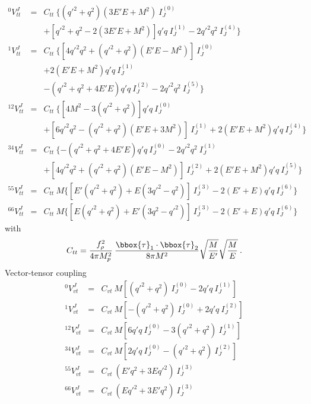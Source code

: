 \begin{eqnarray}
^0V^J_{tt} & = &
C_{tt}\: \{ (q'^2+q^2)(3E'E+M^2)\: I^{(0)}_J \nonumber \\
 & & + [q'^2+q^2-2(3E'E+M^2)]q'q\: I^{(1)}_J - 2q'^2q^2\: I^{(4)}_J \}
\nonumber \\
^1V^J_{tt} & = &
C_{tt}\: \{ [4q'^2q^2+(q'^2+q^2)(E'E-M^2)]\: I^{(0)}_J \nonumber \\
 & & + 2(E'E+M^2)q'q\: I^{(1)}_J \nonumber \\
 & & - (q'^2+q^2+4E'E)q'q\: I^{(2)}_J - 2q'^2q^2\: I^{(5)}_J \}
\label{32.14} \\
^{12}V^J_{tt} & = &
C_{tt}\: \{ [4M^2-3(q'^2+q^2)]q'q\: I^{(0)}_J \nonumber \\
 & & + [6q'^2q^2-(q'^2+q^2)(E'E+3M^2)]\: I^{(1)}_J +
  2(E'E+M^2)q'q\: I^{(4)}_J \}
\nonumber \\
^{34}V^J_{tt} & = &
C_{tt}\: \{ -(q'^2+q^2+4E'E)q'q\: I^{(0)}_J - 2q'^2q^2\: I^{(1)}_J
\nonumber \\
 & & +[4q'^2q^2+(q'^2+q^2)(E'E-M^2)]\: I^{(2)}_J
     +2(E'E+M^2)q'q\: I^{(5)}_J \}
\nonumber \\
^{55}V^J_{tt} & = &
C_{tt}\:  M \{ [ E'(q'^2+q^2) + E (3q'^2 - q^2)]\: I^{(3)}_J
 - 2(E'+E)q'q\: I^{(6)}_J \}
\nonumber \\
^{66}V^J_{tt} & = &
C_{tt}\:  M \{ [ E(q'^2+q^2) + E'(3q^2 - q'^2)]\: I^{(3)}_J
 - 2(E'+E)q'q\: I^{(6)}_J \}
\nonumber
\end{eqnarray}
with
\begin{equation}
C_{tt}= \frac{f^2_{\rho}}{4\pi M_p^2}\: 
\frac{
\bbox{\tau}_1 \cdot \bbox{\tau}_2
}{8\pi M^2}
\sqrt{\frac{M}{E'}}
\sqrt{\frac{M}{E}}
\: .
\label{32.15}
\end{equation}
Vector-tensor coupling
\begin{eqnarray}
^0V^J_{vt} & = &
C_{vt}\: M [ (q'^2+q^2)\: I^{(0)}_J - 2q'q\: I^{(1)}_J ]
\nonumber \\
^1V^J_{vt} & = &
C_{vt}\: M [ -(q'^2+q^2)\: I^{(0)}_J + 2q'q\: I^{(2)}_J ]
\nonumber \\
^{12}V^J_{vt} & = &
C_{vt}\: M [ 6q'q\: I^{(0)}_J - 3(q'^2+q^2)\: I^{(1)}_J ]
\label{32.16} \\
^{34}V^J_{vt} & = &
C_{vt}\: M [ 2q'q\: I^{(0)}_J - (q'^2+q^2)\: I^{(2)}_J ]
\nonumber \\
^{55}V^J_{vt} & = &
C_{vt}\:  (E'q^2+3Eq'^2)\: I^{(3)}_J
\nonumber \\
^{66}V^J_{vt} & = &
C_{vt}\:  (Eq'^2+3E'q^2)\: I^{(3)}_J
\nonumber
\end{eqnarray}
